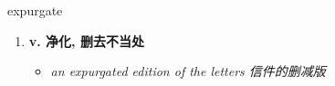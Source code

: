 
\begin{frame}
{\huge expurgate}
\begin{center}
\begin{enumerate}\Large
  \item \textbf{v. 净化, 删去不当处}
  \begin{itemize}
    \item \em{\Large{an expurgated edition of the letters 信件的删减版}}
  \end{itemize}
\end{enumerate}
\end{center}
\end{frame}
